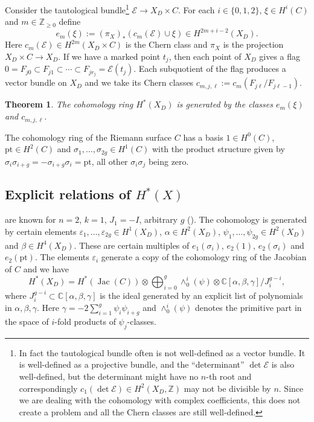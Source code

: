 \documentclass[12pt]{amsart}
\newtheorem{theorem}{Theorem}[section]
\theoremstyle{definition}
\theoremstyle{remark}
\numberwithin{equation}{section}
\newcommand{\BC}{\mathbb C}
\newcommand{\BZ}{\mathbb Z}
\newcommand{\CE}{\mathcal E}
\DeclareMathOperator{\Jac}{Jac}
\begin{document}
	Consider the tautological bundle\footnote{In fact the tautological bundle often is not well-defined as a vector bundle. It is well-defined as a projective bundle, and the ``determinant'' $\det \CE$ is also well-defined, but the determinant might have no $n$-th root and correspondingly $c_1(\det \CE)\in H^2(X_D,\BZ)$ may not be divisible by $n$. Since we are dealing with the cohomology with complex coefficients, this does not create a problem and all the Chern classes are still well-defined.} $\mathcal{E}\to X_D\times C$. For each $i\in\{0,1,2\}$, $\xi\in H^i(C)$ and $m\in\BZ_{\geq 0}$ define
	\begin{equation}\label{eq:definition e}
		e_m(\xi):=(\pi_X)_*( c_m(\mathcal{E}) \cup \xi)\in H^{2m+i-2}(X_D).
	\end{equation}
	Here $c_m(\mathcal{E})\in H^{2m}(X_D\times C)$ is the Chern class and $\pi_{X}$ is the projection $X_D\times C\to X_D$. If we have a marked point $t_j$, then each point of $X_D$ gives a flag $0=F_{j0}\subset F_{j1} \subset\cdots\subset F_{j r_j} = \CE(t_j)$. Each subquotient of the flag produces a vector bundle on $X_D$ and we take its Chern classes $c_{m,j,\ell} := c_m(F_{j \ell} / F_{j \ell-1})$.
	\begin{theorem}
		The cohomology ring $H^*(X_D)$ is generated by the classes $e_m(\xi)$ and $c_{m,j,\ell}$.
	\end{theorem}
	
	The cohomology ring of the Riemann surface $C$ has a basis $1\in H^0(C)$, $\mathrm{pt}\in H^2(C)$ and $\sigma_1,\ldots,\sigma_{2g}\in H^1(C)$ with the product structure given by $\sigma_i \sigma_{i+g} = -\sigma_{i+g}\sigma_i=\mathrm{pt}$, all other $\sigma_i \sigma_j$ being zero.
	
	\subsection{Explicit relations of $H^*(X)$} are known for $n=2$, $k=1$, $J_1=-I$, arbitrary $g$ (\cite{hausel2003relations}). The cohomology is generated by certain elements $\varepsilon_1,\ldots,\varepsilon_{2g}\in H^1(X_D)$, $\alpha\in H^2(X_D)$, $\psi_1,\ldots,\psi_{2g}\in H^2(X_D)$ and $\beta\in H^4(X_D)$. These are certain multiples of $e_1(\sigma_i)$, $e_2(1)$, $e_2(\sigma_i)$ and $e_2(\mathrm{pt})$. The elements $\varepsilon_i$ generate a copy of the cohomology ring of the Jacobian of $C$ and we have
	\[
	H^*(X_D) = H^*(\Jac(C)) \otimes \bigoplus_{i=0}^g \wedge_0^i(\psi) \otimes \BC[\alpha,\beta,\gamma] / J_{i}^{g-i},
	\]
	where $J_{i}^{g-i}\subset \BC[\alpha,\beta,\gamma]$ is the ideal generated by an explicit list of polynomials in $\alpha, \beta, \gamma$. Here $\gamma=-2 \sum_{i=1}^g \psi_i \psi_{i+g}$ and $\wedge_0^i(\psi)$ denotes the primitive part in the space of $i$-fold products of $\psi_j$-classes. 
	
\end{document}

